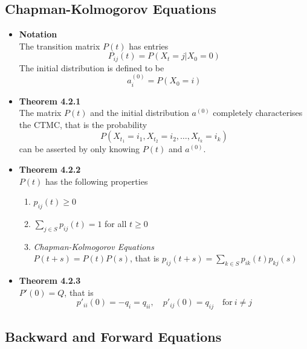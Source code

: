 \documentclass[11pt,a4paper]{article}
\begin{document}
\subsection{Chapman-Kolmogorov Equations}

\begin{itemize}
    \item \textbf{Notation} \\
        The transition matrix $P(t)$ has entries
        \[
            P_{ij}(t) = P(X_t = j | X_0 = 0)
        \]
        The initial distribution is defined to be
        \[
            a_i^{(0)} = P(X_0 = i)
        \]
    \item \textbf{Theorem 4.2.1} \\
        The matrix $P(t)$ and the initial distribution $a^{(0)}$ completely characterises the CTMC,
        that is the probability
        \[
            P(X_{t_1} = i_1, X_{t_2} = i_2, \ldots, X_{t_k} = i_k)
        \]
        can be asserted by only knowing $P(t)$ and $a^{(0)}$.
    \item \textbf{Theorem 4.2.2} \\
        $P(t)$ has the following properties
        \begin{enumerate}
            \item $p_{ij}(t) \geq 0$
            \item $\sum_{j \in S} p_{ij}(t) = 1$ for all $t \geq 0$
            \item \emph{Chapman-Kolmogorov Equations} \\
                $P(t+s) = P(t) P(s)$, that is $p_{ij}(t+s) = \sum_{k \in S} p_{ik}(t) p_{kj}(s)$
        \end{enumerate}
    \item \textbf{Theorem 4.2.3} \\
        $P'(0) = Q$, that is
        \[
            p'_{ii}(0) = -q_i = q_{ii}, \quad p'_{ij}(0) = q_{ij} \quad \text{for} \ i \neq j
        \]
\end{itemize}

\subsection{Backward and Forward Equations}
\end{document}
